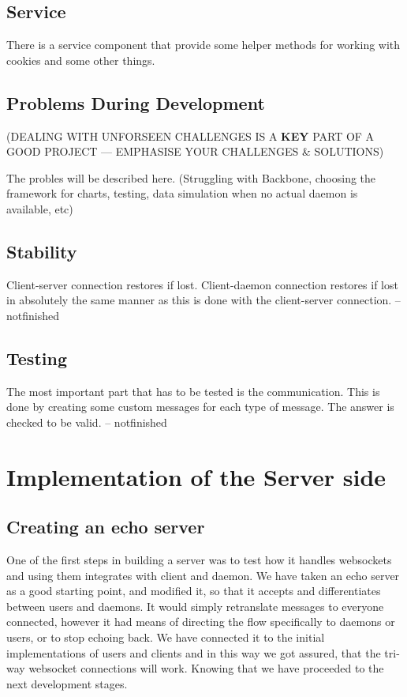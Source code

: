 \documentclass{l3proj}
\begin{document}
\subsection{Service}

There is a service component that provide some helper methods for working with cookies and some other things.


\subsection{Problems During Development}

(DEALING WITH UNFORSEEN CHALLENGES IS A \textbf{KEY} PART OF A GOOD PROJECT --- EMPHASISE YOUR CHALLENGES \& SOLUTIONS)

The probles will be described here. (Struggling with Backbone, choosing the framework for charts, testing, data simulation when no actual daemon is available, etc)

\subsection{Stability}

Client-server connection restores if lost.
Client-daemon connection restores if lost in absolutely the same manner as this is done with the client-server connection.
-- notfinished

\subsection{Testing}

The most important part that has to be tested is the communication. This is done by creating some custom messages for each type of message. The answer is checked to be valid.
-- notfinished


\section{Implementation of the Server side}

\subsection{Creating an echo server}

One of the first steps in building a server was to test how it handles websockets and using them integrates with client and daemon. We have taken an echo server as a good starting point, and modified it, so that it accepts and differentiates between users and daemons. It would simply retranslate messages to everyone connected, however it had means of directing the flow specifically to daemons or users, or to stop echoing back. We have connected it to the initial implementations of users and clients and in this way we got assured, that the tri-way websocket connections will work. Knowing that we have proceeded to the next development stages.
\end{document}
